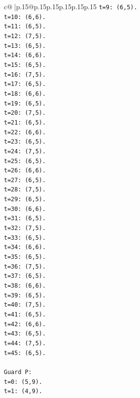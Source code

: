 \documentclass{article}
\begin{document}
{\begin{supertabular}{c@{$\;$}|p{.15\linewidth}@{}p{.15\linewidth}p{.15\linewidth}p{.15\linewidth}p{.15\linewidth}p{.15\linewidth}}
{{{\texttt{t=9: (6,5).} \\
\texttt{t=10: (6,6).} \\
\texttt{t=11: (6,5).} \\
\texttt{t=12: (7,5).} \\
\texttt{t=13: (6,5).} \\
\texttt{t=14: (6,6).} \\
\texttt{t=15: (6,5).} \\
\texttt{t=16: (7,5).} \\
\texttt{t=17: (6,5).} \\
\texttt{t=18: (6,6).} \\
\texttt{t=19: (6,5).} \\
\texttt{t=20: (7,5).} \\
\texttt{t=21: (6,5).} \\
\texttt{t=22: (6,6).} \\
\texttt{t=23: (6,5).} \\
\texttt{t=24: (7,5).} \\
\texttt{t=25: (6,5).} \\
\texttt{t=26: (6,6).} \\
\texttt{t=27: (6,5).} \\
\texttt{t=28: (7,5).} \\
\texttt{t=29: (6,5).} \\
\texttt{t=30: (6,6).} \\
\texttt{t=31: (6,5).} \\
\texttt{t=32: (7,5).} \\
\texttt{t=33: (6,5).} \\
\texttt{t=34: (6,6).} \\
\texttt{t=35: (6,5).} \\
\texttt{t=36: (7,5).} \\
\texttt{t=37: (6,5).} \\
\texttt{t=38: (6,6).} \\
\texttt{t=39: (6,5).} \\
\texttt{t=40: (7,5).} \\
\texttt{t=41: (6,5).} \\
\texttt{t=42: (6,6).} \\
\texttt{t=43: (6,5).} \\
\texttt{t=44: (7,5).} \\
\texttt{t=45: (6,5).} \\
\\ 
\texttt{Guard P:} \\
\texttt{t=0: (5,9).} \\
\texttt{t=1: (4,9).} \\
}}}
\end{supertabular}}
\end{document}

